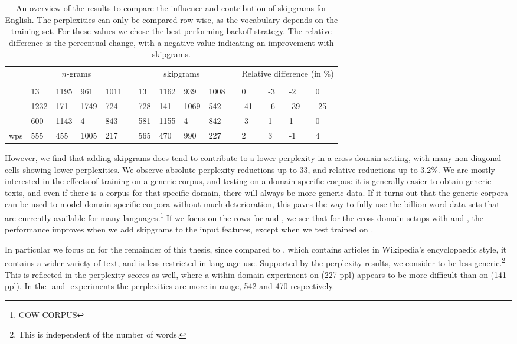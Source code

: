      \begin{table*}
	\begin{tabular}{lllllllllllllll}
		& \multicolumn{4}{c}{$n$-grams}	& & \multicolumn{4}{c}{skipgrams}&& \multicolumn{4}{c}{Relative difference (in \%)}\\
		& \jrc	& \obw	& \emea	& \wp	& & \jrc	& \obw	& \emea	& \wp	& & \jrc	& \obw	& \emea	& \wp \\ \cline{2-5}\cline{7-10} \cline{12-15}
		\jrc		& 13	& 1195	& 961	& 1011	& & 13	& 1162	& 939	& 1008	& & 0	& -3	& -2	& 0		\\
		\obw	& 1232	& 171	& 1749	& 724	& & 728	& 141	& 1069	& 542	& & -41	& -6	& -39	& -25	\\
		\emea	& 600	& 1143	& 4		& 843	& & 581	& 1155	& 4		& 842	& & -3	& 1	& 1		& 0		\\
		wps		& 555	& 455	& 1005	& 217	& & 565	& 470	& 990	& 227	& & 2	& 3	& -1	& 4
	\end{tabular} 
	\caption{An overview of the results to compare the influence and contribution of skipgrams for English. 
		The perplexities can only be compared row-wise, as the vocabulary depends on the training set. For these values we chose the best-performing backoff strategy. The relative difference is the percentual change, with a negative value indicating an improvement with skipgrams.}\label{ta:ngramvsskipgram}
\end{table*} 

However, we find that adding skipgrams does tend to contribute to a lower perplexity in a cross-domain setting, with many non-diagonal cells showing lower perplexities. We observe absolute perplexity reductions up to 33, and relative reductions up to 3.2\%. We are mostly interested in the effects of training on a generic corpus, and testing on a domain-specific corpus: it is generally easier to obtain generic texts, and even if there is a corpus for that specific domain, there will always be more generic data. If it turns out that the generic corpora can be used to model domain-specific corpora without much deterioration, this paves the way to fully use the billion-word data sets that are currently available for many languages.\footnote{COW CORPUS} If we focus on the rows for \obw and \wp, we see that for the cross-domain setups with \jrc and \emea, the performance improves when we add skipgrams to the input features, except when we test \jrc trained on \wp.

In particular we focus on \obw for the remainder of this thesis, since compared to \wp, which contains articles in Wikipedia's encyclopaedic style, it contains a wider variety of text, and is less restricted in language use. Supported by the perplexity results, we consider \wp to be less generic.\footnote{This is independent of the number of words.} This is reflected in the perplexity scores as well, where a within-domain experiment on \wp (227 ppl) appears to be more difficult than on \obw (141 ppl). In the \obw-\wp and \wp-\obw experiments the perplexities are more in range, 542 and 470 respectively.

